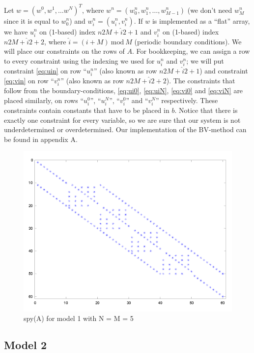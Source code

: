 \documentclass{article}
\renewcommand{\mod}{~\mathrm{mod}~}
\renewcommand{\(}{\left(}
\renewcommand{\)}{\right)}
\newcommand{\uin}{u_i^n}
\newcommand{\vin}{v_i^n}
\begin{document}
Let $w=(w^0, w^1, \dots w^N)^T$, where $w^n=(w_0^n,w_1^n,\dots,w_{M-1}^n)$ (we don't need $w_M^n$ since it is equal to $w_0^n$) and $w_i^n = (\uin,\vin)$. If $w$ is implemented as a ``flat'' array, we have $\uin$ on (1-based) index $n2M+\hat i 2+1$ and $\vin$ on (1-based) index $n2M+\hat i 2+2$, where $\hat i = (i+M)\mod M$ (periodic boundary conditions).%
We will place our constraints on the rows of $A$. For bookkeeping, we can assign a row to every constraint using the indexing we used for $\uin$ and $\vin$; we will put constraint \eqref{eq:uin} on row ``$\uin$'' (also known as row $n2M+\hat i 2+1$) and constraint \eqref{eq:vin} on row ``$\vin$'' (also known as row $n2M+\hat i 2+2$). The constraints that follow from the boundary-conditions, \eqref{eq:ui0}, \eqref{eq:uiN}, \eqref{eq:vi0} and \eqref{eq:viN} are placed similarly, on rows ``$u_i^0$'', ``$u_i^N$'', ``$v_i^0$'' and ``$v_i^N$'' respectively. These constraints contain constants that have to be placed in $b$. Notice that there is exactly one constraint for every variable, so we are sure that our system is not underdetermined or overdetermined. Our implementation of the BV-method can be found in appendix A.

\begin{figure}
\centering
\includegraphics[width=\textwidth]{spy.png}
\caption{spy(A) for model 1 with N = M = 5}
\label{fig:spy}
\end{figure}

\subsection*{Model 2}
\end{document}
